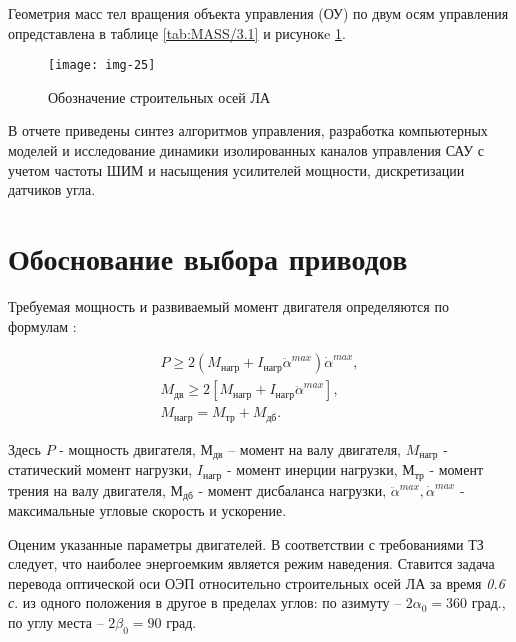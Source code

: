 
Геометрия масс тел вращения объекта управления (ОУ) по двум осям управления опредставлена в таблице \ref{tab:MASS/3.1} и рисунокe \ref{fig:41}.


\begin{figure}[!ht]
	\centering
	\texttt{[image: img-25]} 
	\caption{Обозначение строительных осей ЛА}
	\label{fig:41}
\end{figure}


В отчете приведены синтез алгоритмов управления, разработка компьютерных моделей и исследование динамики изолированных каналов управления САУ с учетом частоты ШИМ и насыщения усилителей мощности, дискретизации датчиков угла.


\section{Обоснование выбора приводов} \label{ch:ch4/sect2}

Требуемая мощность и развиваемый момент двигателя определяются по формулам \cite[]{Bessekerski}:\par


\begin{equation}
	\label{eq:p4:1}
	\begin{multlined}
P \geq 2 \left( M_{\textit{нагр}}+I_{\textit{нагр}} \ddot \alpha^{max}   \right) \dot \alpha^{max},\\
M_{\textit{дв}} \geq 2 \left[ M_{\textit{нагр}}+I_{\textit{нагр}} \ddot \alpha^{max}  \right], \\
M_{\textit{нагр}}=M_{\textit{тр}}+M_{\textit{дб}}.
\end{multlined}
\end{equation}

Здесь 
$P$ - мощность двигателя, 
$М_{\textit{дв}}$ – момент на валу двигателя, 
$M_{\textit{нагр}}$ - статический момент нагрузки, 
$I_{\textit{нагр}}$ - момент  инерции нагрузки, 
$М_{\textit{тр}}$ - момент трения на валу двигателя,
$М_{\textit{дб}}$ - момент дисбаланса нагрузки,  
$\ddot \alpha^{max}, \dot \alpha^{max}$ - максимальные угловые скорость и ускорение.\par

Оценим указанные параметры двигателей. 
В соответствии с требованиями ТЗ следует, что наиболее энергоемким является режим наведения. Ставится задача перевода оптической оси ОЭП относительно строительных осей ЛА за время \textit{0.6 с}. из одного положения в другое в пределах углов: по азимуту – $2 \alpha_0 = 360$ град., по углу места – $2 \beta_0 = 90$ град.  \par

